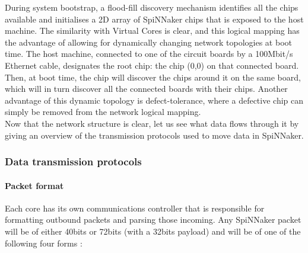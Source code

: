 During system bootstrap, a flood-fill discovery mechanism identifies all the chips available and initialises a 2D array of SpiNNaker chips that is exposed to the host machine. The similarity with Virtual Cores is clear, and this logical mapping has the advantage of allowing for dynamically changing network topologies at boot time. The host machine, connected to one of the circuit boards by a 100Mbit/s Ethernet cable, designates the root chip: the chip (0,0) on that connected board. Then, at boot time, the chip will discover the chips around it on the same board, which will in turn discover all the connected boards with their chips. Another advantage of this dynamic topology is defect-tolerance, where a defective chip can simply be removed from the network logical mapping. \\

Now that the network structure is clear, let us see what data flows through it by giving an overview of the transmission protocols used to move data in SpiNNaker. \\


\subsubsection{Data transmission protocols} \label{sec:tp}

\paragraph{Packet format}  \label{sec:pf}

Each core has its own communications controller that is responsible for formatting outbound packets and parsing those incoming. Any SpiNNaker packet will be of either 40bits or 72bits (with a 32bits payload) and will be of one of the following four forms \cite{testchip}:

